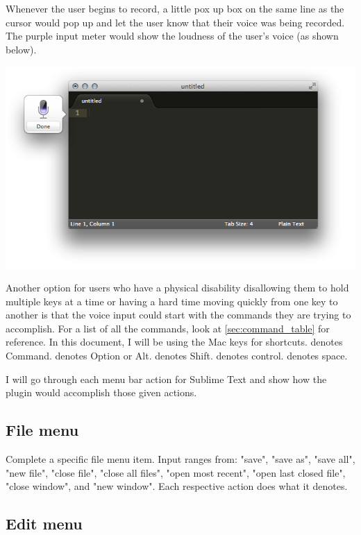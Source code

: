 \documentclass[11pt, oneside]{article}
\begin{document}
Whenever the user begins to record, a little pox up box on the same line as the cursor would pop up and let the user know that their voice was being recorded. The purple input meter would show the loudness of the user's voice (as shown below).
\begin{center}
\includegraphics[width=\textwidth]{dictation.png}
\end{center}

Another option for users who have a physical disability disallowing them to hold multiple keys at a time or having a hard time moving quickly from one key to another is that the voice input could start with the commands they are trying to accomplish. For a list of all the commands, look at \ref{sec:command_table} for reference. In this document, I will be using the Mac keys for shortcuts. \keys{\cmd} denotes Command. \keys{\Alt} denotes Option or Alt. \keys{\shift} denotes Shift. \keys{\ctrl} denotes control. \keys{\Space} denotes space.

I will go through each menu bar action for Sublime Text and show how the plugin would accomplish those given actions.

\subsection{File menu \hfill {}}


Complete a specific file menu item. Input ranges from: "save", "save as", "save all", "new file", "close file", "close all files", "open most recent", "open last closed file", "close window", and "new window". Each respective action does what it denotes.

\subsection{Edit menu \hfill {}}
\end{document}

